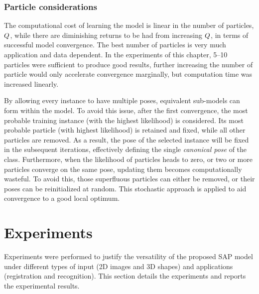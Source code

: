 \subsubsection{Particle considerations}
The computational cost of learning the model is linear in the number of particles, $Q$, while there are diminishing returns to be had from increasing $Q$, in terms of successful model convergence. The best number of particles is very much application and data dependent. In the experiments of this chapter, 5--10 particles were sufficient to produce good results, further increasing the number of particle would only accelerate convergence marginally, but computation time was increased linearly. 

By allowing every instance to have multiple poses, equivalent sub-models can form within the model.
To avoid this issue, after the first convergence, the most probable training instance (with the highest likelihood) is considered. Its most probable particle (with highest likelihood) is retained and fixed, while all other particles are removed. As a result, the pose of the selected instance will be fixed in the subsequent iterations, effectively defining the single \emph{canonical pose} of the class. 
Furthermore, when the likelihood of particles heads to zero, or two or more particles converge on the same pose, updating them becomes computationally wasteful. To avoid this, those superfluous particles can either be removed, or their poses can be reinitialized at random. This stochastic approach is applied to aid convergence to a good local optimum.  


\section{Experiments}
\label{sec/reg/experiments}


Experiments were performed to justify the versatility of the proposed SAP model under different types of input (2D images and 3D shapes) and applications (registration and recognition). This section details the experiments and reports the experimental results.


